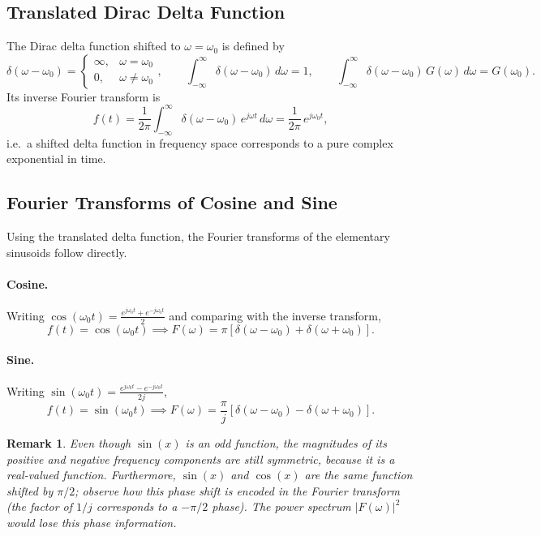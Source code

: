 \documentclass{article}
\newtheorem{remark}{Remark}
\begin{document}
\subsection{Translated Dirac Delta Function}

The Dirac delta function shifted to $\omega = \omega_0$ is defined by
\[\delta(\omega - \omega_0) = \begin{cases} \infty, & \omega = \omega_0 \\ 0, & \omega \neq \omega_0 \end{cases}, \qquad \int_{-\infty}^{\infty} \delta(\omega - \omega_0)\,d\omega = 1, \qquad \int_{-\infty}^{\infty} \delta(\omega - \omega_0)\,G(\omega)\,d\omega = G(\omega_0).\]
Its inverse Fourier transform is
\[f(t) = \frac{1}{2\pi}\int_{-\infty}^{\infty} \delta(\omega - \omega_0)\,e^{j\omega t}\,d\omega = \frac{1}{2\pi}\,e^{j\omega_0 t},\]
i.e.\ a shifted delta function in frequency space corresponds to a pure complex exponential in time.

\subsection{Fourier Transforms of Cosine and Sine}

Using the translated delta function, the Fourier transforms of the elementary sinusoids follow directly.

\paragraph{Cosine.}
Writing $\cos(\omega_0 t) = \frac{e^{j\omega_0 t} + e^{-j\omega_0 t}}{2}$ and comparing with the inverse transform,
\[f(t) = \cos(\omega_0 t) \implies F(\omega) = \pi\left[\delta(\omega - \omega_0) + \delta(\omega + \omega_0)\right].\]

\paragraph{Sine.}
Writing $\sin(\omega_0 t) = \frac{e^{j\omega_0 t} - e^{-j\omega_0 t}}{2j}$,
\[f(t) = \sin(\omega_0 t) \implies F(\omega) = \frac{\pi}{j}\left[\delta(\omega - \omega_0) - \delta(\omega + \omega_0)\right].\]

\begin{remark}
    Even though $\sin(x)$ is an odd function, the magnitudes of its positive and negative frequency components are still symmetric, because it is a real-valued function. Furthermore, $\sin(x)$ and $\cos(x)$ are the same function shifted by $\pi/2$; observe how this phase shift is encoded in the Fourier transform (the factor of $1/j$ corresponds to a $-\pi/2$ phase). The power spectrum $|F(\omega)|^2$ would lose this phase information.
\end{remark}
\end{document}
